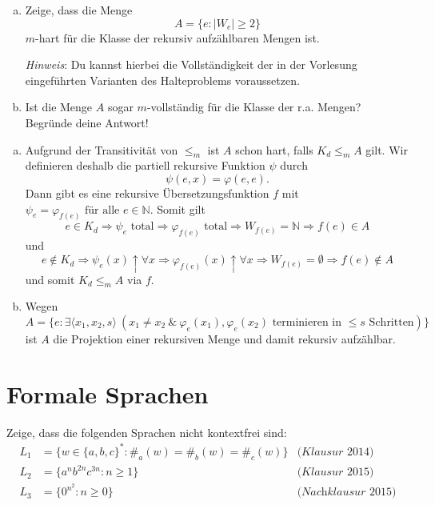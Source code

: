 \documentclass[german,headsepline]{scrartcl}
\begin{document}
	\begin{question}[subtitle={Klausur 2009}]
		\begin{enumerate}[(a)]
			\item Zeige, dass die Menge
				\[A=\{e\colon\vert W_e\vert\geq2\}\]
				$m$-hart für die Klasse der rekursiv aufzählbaren Mengen ist.
			
				\textit{Hinweis}: Du kannst hierbei die Vollständigkeit der in der Vorlesung eingeführten Varianten des Halteproblems voraussetzen.
			\item Ist die Menge $A$ sogar $m$-vollständig für die Klasse der r.a. Mengen? Begründe deine Antwort!
		\end{enumerate}
	\end{question}
	\begin{solution}
		\begin{enumerate}[(a)]
			\item Aufgrund der Transitivität von $\leq_m$ ist $A$ schon hart, falls $K_d\leq_mA$ gilt.
				Wir definieren deshalb die partiell rekursive Funktion $\psi$ durch
				\[\psi(e,x)=\varphi(e,e).\]
				Dann gibt es eine rekursive Übersetzungsfunktion $f$ mit
				$\psi_e=\varphi_{f(e)}\text{ für alle }e\in\mathbb{N}$.
				Somit gilt
				\[e\in K_d\Rightarrow\psi_e\text{ total}\Rightarrow\varphi_{f(e)}\text{ total}
				\Rightarrow W_{f(e)}=\mathbb{N}\Rightarrow f(e)\in A\]
				und
				\[e\notin K_d\Rightarrow\psi_e(x)\uparrow\forall x\Rightarrow\varphi_{f(e)}(x)\uparrow\forall x
				\Rightarrow W_{f(e)}=\emptyset\Rightarrow f(e)\notin A\]
				und somit $K_d\leq_mA$ via $f$.
			\item Wegen
				\[A=\{e\colon\exists\langle x_1,x_2,s\rangle~(x_1\neq x_2~\&~\varphi_e(x_1),\varphi_e(x_2)\text{ terminieren in $\leq s$ Schritten})\}\]
				ist $A$ die Projektion einer rekursiven Menge und damit rekursiv aufzählbar.
		\end{enumerate}
	\end{solution}
	
	\section{Formale Sprachen}
	\begin{question}
		Zeige, dass die folgenden Sprachen nicht kontextfrei sind:
		\begin{align*}
			L_1 &= \{w\in\{a,b,c\}^*\colon \#_a(w)=\#_b(w)=\#_c(w)\} & \textit{(Klausur 2014)} \\
			L_2 &= \{a^nb^{2n}c^{3n}\colon n\geq1\} & \textit{(Klausur 2015)} \\
			L_3 &= \{0^{n^2}\colon n\geq0\} & \textit{(Nachklausur 2015)}
		\end{align*}
	\end{question}
	
\end{document}
